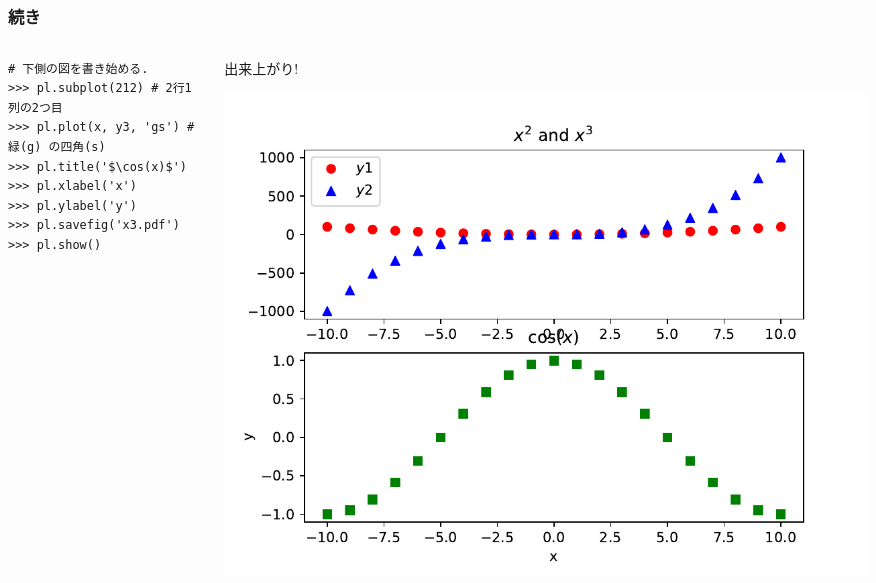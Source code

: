 \subsection*{\redm\whitem\greenb}
\begin{frame}[t,fragile]
\frametitle{続き}
\begin{columns}
\begin{column}{6cm}
\begin{lstlisting}
# 下側の図を書き始める.
>>> pl.subplot(212) # 2行1列の2つ目
>>> pl.plot(x, y3, 'gs') # 緑(g) の四角(s)
>>> pl.title('$\cos(x)$')
>>> pl.xlabel('x')
>>> pl.ylabel('y')
>>> pl.savefig('x3.pdf') 
>>> pl.show()
\end{lstlisting}
\end{column}
\begin{column}{6cm}
出来上がり!
\begin{center}
\includegraphics[width=\textwidth]{x3.pdf}
\end{center}
\end{column}
\end{columns}
\end{frame}


